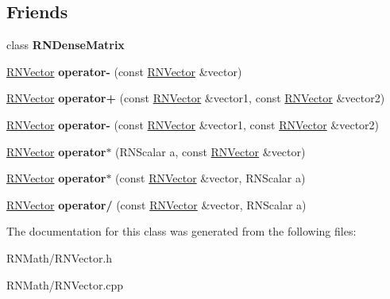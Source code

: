 \subsection*{Friends}
\begin{DoxyCompactItemize}
\item 
class {\bfseries R\+N\+Dense\+Matrix}\hypertarget{class_r_n_vector_ad7f7bcd3bd5154305d7d7efc6a2601b2}{}\label{class_r_n_vector_ad7f7bcd3bd5154305d7d7efc6a2601b2}

\item 
\hyperlink{class_r_n_vector}{R\+N\+Vector} {\bfseries operator-\/} (const \hyperlink{class_r_n_vector}{R\+N\+Vector} \&vector)\hypertarget{class_r_n_vector_a55947c43bdb1fe86a9f075c52d5cf800}{}\label{class_r_n_vector_a55947c43bdb1fe86a9f075c52d5cf800}

\item 
\hyperlink{class_r_n_vector}{R\+N\+Vector} {\bfseries operator+} (const \hyperlink{class_r_n_vector}{R\+N\+Vector} \&vector1, const \hyperlink{class_r_n_vector}{R\+N\+Vector} \&vector2)\hypertarget{class_r_n_vector_aabf0273765d8fa73e6799fec99bc3b34}{}\label{class_r_n_vector_aabf0273765d8fa73e6799fec99bc3b34}

\item 
\hyperlink{class_r_n_vector}{R\+N\+Vector} {\bfseries operator-\/} (const \hyperlink{class_r_n_vector}{R\+N\+Vector} \&vector1, const \hyperlink{class_r_n_vector}{R\+N\+Vector} \&vector2)\hypertarget{class_r_n_vector_ab4ba9b000137a503d54e3b3526fb7be5}{}\label{class_r_n_vector_ab4ba9b000137a503d54e3b3526fb7be5}

\item 
\hyperlink{class_r_n_vector}{R\+N\+Vector} {\bfseries operator$\ast$} (R\+N\+Scalar a, const \hyperlink{class_r_n_vector}{R\+N\+Vector} \&vector)\hypertarget{class_r_n_vector_a83795bad11797142573e219d3886c0aa}{}\label{class_r_n_vector_a83795bad11797142573e219d3886c0aa}

\item 
\hyperlink{class_r_n_vector}{R\+N\+Vector} {\bfseries operator$\ast$} (const \hyperlink{class_r_n_vector}{R\+N\+Vector} \&vector, R\+N\+Scalar a)\hypertarget{class_r_n_vector_ad0df169d0f2f1ab5137e3526ac29084f}{}\label{class_r_n_vector_ad0df169d0f2f1ab5137e3526ac29084f}

\item 
\hyperlink{class_r_n_vector}{R\+N\+Vector} {\bfseries operator/} (const \hyperlink{class_r_n_vector}{R\+N\+Vector} \&vector, R\+N\+Scalar a)\hypertarget{class_r_n_vector_a876135cceea526231953cd7bcec16dda}{}\label{class_r_n_vector_a876135cceea526231953cd7bcec16dda}

\end{DoxyCompactItemize}


The documentation for this class was generated from the following files\+:\begin{DoxyCompactItemize}
\item 
R\+N\+Math/R\+N\+Vector.\+h\item 
R\+N\+Math/R\+N\+Vector.\+cpp\end{DoxyCompactItemize}
